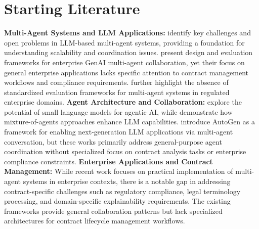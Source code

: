 
\section{Starting Literature}\label{section:starting_literature}

\textbf{Multi-Agent Systems and LLM Applications:} \cite{han2025llmmultiagentsystemschallenges} identify key challenges and open problems in LLM-based multi-agent systems, providing a foundation for understanding scalability and coordination issues. \cite{shu2024effectivegenaimultiagentcollaboration} present design and evaluation frameworks for enterprise GenAI multi-agent collaboration, yet their focus on general enterprise applications lacks specific attention to contract management workflows and compliance requirements. \cite{yehudai2025llmagentevaluationregulated} further highlight the absence of standardized evaluation frameworks for multi-agent systems in regulated enterprise domains.
\newline
\break
\textbf{Agent Architecture and Collaboration:} \cite{belcak2025smalllanguagemodelsfuture} explore the potential of small language models for agentic AI, while \cite{wang2024mixtureofagentsenhanceslargelanguage} demonstrate how mixture-of-agents approaches enhance LLM capabilities. \cite{wu2023autogenenablingnextgenllm} introduce AutoGen as a framework for enabling next-generation LLM applications via multi-agent conversation, but these works primarily address general-purpose agent coordination without specialized focus on contract analysis tasks or enterprise compliance constraints.
\newline
\break
\textbf{Enterprise Applications and Contract Management:} While recent work focuses on practical implementation of multi-agent systems in enterprise contexts, there is a notable gap in addressing contract-specific challenges such as regulatory compliance, legal terminology processing, and domain-specific explainability requirements. The existing frameworks provide general collaboration patterns but lack specialized architectures for contract lifecycle management workflows.
